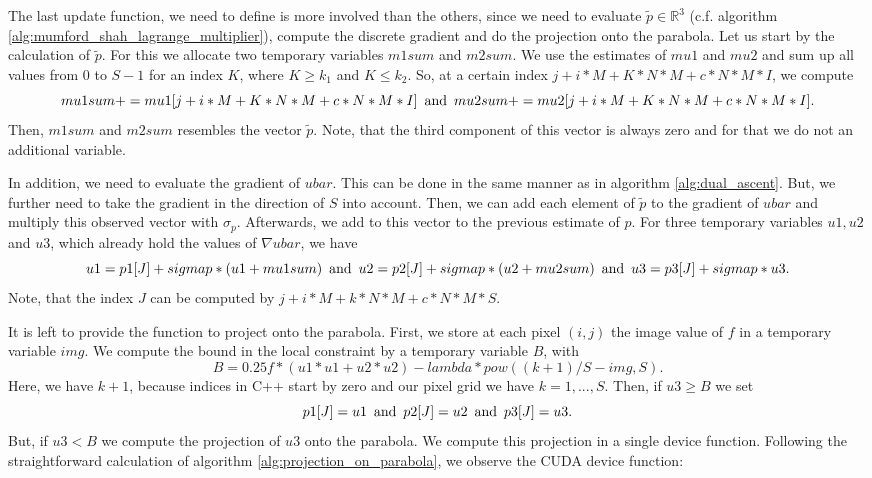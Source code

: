 \documentclass{scrreprt}
\begin{document}
            The last update function, we need to define is more involved than the others, since we need to evaluate $\tilde{p} \in \mathbb{R}^{3}$ (c.f. algorithm \ref{alg:mumford_shah_lagrange_multiplier}), compute the discrete gradient and do the projection onto the parabola. Let us start by the calculation of $\tilde{p}$. For this we allocate two temporary variables $m1sum$ and $m2sum$. We use the estimates of $mu1$ and $mu2$ and sum up all values from $0$ to $S - 1$ for an index $K$, where $K \ge k_{1}$ and $K \le k_{2}$. So, at a certain index $j+i*M+K*N*M+c*N*M*I$, we compute
                $$
                    mu1sum += mu1[j+i*M+K*N*M+c*N*M*I] \,\,\, \textnormal{and} \,\,\, mu2sum += mu2[j+i*M+K*N*M+c*N*M*I].
                $$
            Then, $m1sum$ and $m2sum$ resembles the vector $\tilde{p}$. Note, that the third component of this vector is always zero and for that we do not an additional variable.

            In addition, we need to evaluate the gradient of $ubar$. This can be done in the same manner as in algorithm \ref{alg:dual_ascent}. But, we further need to take the gradient in the direction of $S$ into account. Then, we can add each element of $\tilde{p}$ to the gradient of $ubar$ and multiply this observed vector with $\sigma_{p}$. Afterwards, we add to this vector to the previous estimate of $p$. For three temporary variables $u1, u2$ and $u3$, which already hold the values of $\nabla ubar$, we have
                $$
                    u1 = p1[J]+sigmap*(u1+mu1sum) \,\,\, \textnormal{and} \,\,\, u2 = p2[J]+sigmap*(u2+mu2sum) \,\,\, \textnormal{and} \,\,\, u3 = p3[J]+sigmap*u3.
                $$
            Note, that the index $J$ can be computed by $j+i*M+k*N*M+c*N*M*S$.

            It is left to provide the function to project onto the parabola. First, we store at each pixel $(i,j)$ the image value of $f$ in a temporary variable $img$. We compute the bound in the local constraint by a temporary variable $B$, with
                $$
                    B = 0.25f * (u1*u1 + u2*u2) - lambda * pow((k+1)/S - img, S).
                $$
            Here, we have $k+1$, because indices in C++ start by zero and our pixel grid we have $k = 1, ..., S$. Then, if $u3 \ge B$ we set
                $$
                    p1[J] = u1 \,\,\, \textnormal{and} \,\,\, p2[J] = u2 \,\,\, \textnormal{and} \,\,\, p3[J] = u3.
                $$
            But, if $u3 < B$ we compute the projection of $u3$ onto the parabola. We compute this projection in a single device function. Following the straightforward calculation of algorithm \ref{alg:projection_on_parabola}, we observe the CUDA device function:
\end{document}
